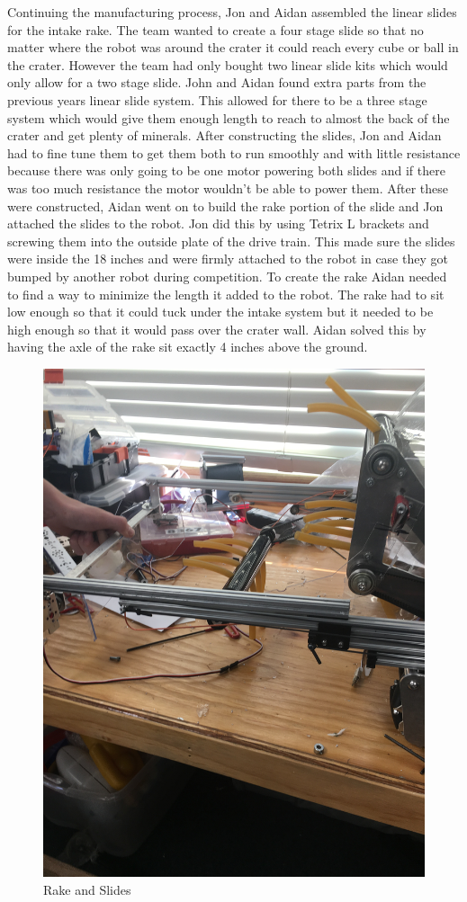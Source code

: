 \documentclass{article}
\begin{document}
Continuing the manufacturing process, Jon and Aidan assembled the linear slides for the intake rake. The team wanted to create a four stage slide so that no matter where the robot was around the crater it could reach every cube or ball in the crater. However the team had only bought two linear slide kits which would only allow for a two stage slide. John and Aidan found extra parts from the previous years linear slide system. This allowed for there to be a three stage system which would give them enough length to reach to almost the back of the crater and get plenty of minerals. After constructing the slides, Jon and Aidan had to fine tune them to get them both to run smoothly and with little resistance because there was only going to be one motor powering both slides and if there was too much resistance the motor wouldn't be able to power them. After these were constructed, Aidan went on to build the rake portion of the slide and Jon attached the slides to the robot. Jon did this by using Tetrix L brackets and screwing them into the outside plate of the drive train. This made sure the slides were inside the 18 inches and were firmly attached to the robot in case they got bumped by another robot during competition. To create the rake Aidan needed to find a way to minimize the length it added to the robot. The rake had to sit low enough so that it could tuck under the intake system but it needed to be high enough so that it would pass over the crater wall. Aidan solved this by having the axle of the rake sit exactly 4 inches above the ground.

\begin{figure}
    \centering
    \includegraphics[width=.6 \textwidth, angle=-90 ]{11_11-12/images/rake_slides.JPG}
    \caption{Rake and Slides}
    \label{fig:Intake CAD}
\end{figure}
\end{document}

